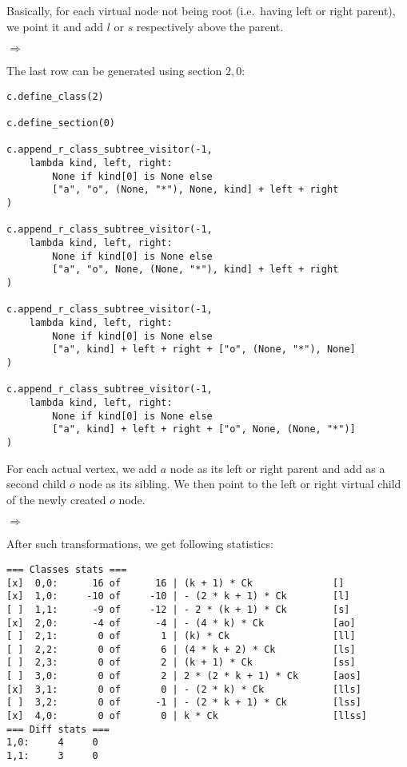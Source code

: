 \documentclass[final]{article}
\theoremstyle{definition}
\theoremstyle{remark}
\newcommand{\includeinlinesvg}[2]{\begin{minipage}{#1\textwidth}\end{minipage}}
\begin{document}
Basically, for each virtual node not being root (i.e.\ having left or right parent), we point it and add \(l\) or \(s\) respectively above the parent.

\includeinlinesvg{.32}{lambda__trees_111__1_base}%
\(\Rightarrow\)
\includeinlinesvg{.32}{lambda__trees_101__0}%
\includeinlinesvg{.32}{lambda__trees_112__0}%

The last row can be generated using section \(2, 0\):

\begin{lstlisting}
c.define_class(2)

c.define_section(0)

c.append_r_class_subtree_visitor(-1,
    lambda kind, left, right:
        None if kind[0] is None else
        ["a", "o", (None, "*"), None, kind] + left + right
)

c.append_r_class_subtree_visitor(-1,
    lambda kind, left, right:
        None if kind[0] is None else
        ["a", "o", None, (None, "*"), kind] + left + right
)

c.append_r_class_subtree_visitor(-1,
    lambda kind, left, right:
        None if kind[0] is None else
        ["a", kind] + left + right + ["o", (None, "*"), None]
)

c.append_r_class_subtree_visitor(-1,
    lambda kind, left, right:
        None if kind[0] is None else
        ["a", kind] + left + right + ["o", None, (None, "*")]
)
\end{lstlisting}

For each actual vertex, we add \(a\) node as its left or right parent and add as a second child \(o\) node as its sibling. We then point to the left or right virtual child of the newly created \(o\) node.

\includeinlinesvg{.20}{lambda__trees_200__0_base}%
\(\Rightarrow\)
\includeinlinesvg{.20}{lambda__trees_200__0}%
\includeinlinesvg{.20}{lambda__trees_201__0}%
\includeinlinesvg{.20}{lambda__trees_202__0}%
\includeinlinesvg{.20}{lambda__trees_203__0}%

After such transformations, we get following statistics:

\begin{lstlisting}
=== Classes stats ===
[x]  0,0:      16 of      16 | (k + 1) * Ck              []
[x]  1,0:     -10 of     -10 | - (2 * k + 1) * Ck        [l]
[ ]  1,1:      -9 of     -12 | - 2 * (k + 1) * Ck        [s]
[x]  2,0:      -4 of      -4 | - (4 * k) * Ck            [ao]
[ ]  2,1:       0 of       1 | (k) * Ck                  [ll]
[ ]  2,2:       0 of       6 | (4 * k + 2) * Ck          [ls]
[ ]  2,3:       0 of       2 | (k + 1) * Ck              [ss]
[ ]  3,0:       0 of       2 | 2 * (2 * k + 1) * Ck      [aos]
[x]  3,1:       0 of       0 | - (2 * k) * Ck            [lls]
[ ]  3,2:       0 of      -1 | - (2 * k + 1) * Ck        [lss]
[x]  4,0:       0 of       0 | k * Ck                    [llss]
=== Diff stats ===
1,0:     4     0
1,1:     3     0
\end{lstlisting}
\end{document}
